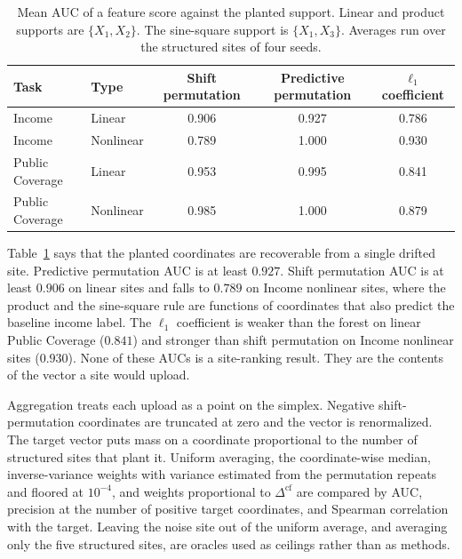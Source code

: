 \begin{table}[t]
\centering
\caption{Mean AUC of a feature score against the planted support.
Linear and product supports are $\{X_1,X_2\}$.
The sine-square support is $\{X_1,X_3\}$.
Averages run over the structured sites of four seeds.}
\label{tab:feature}
\begin{tabular}{llccc}
\toprule
Task & Type & Shift permutation & Predictive permutation & $\ell_1$ coefficient \\
\midrule
Income & Linear & 0.906 & 0.927 & 0.786 \\
Income & Nonlinear & 0.789 & 1.000 & 0.930 \\
Public Coverage & Linear & 0.953 & 0.995 & 0.841 \\
Public Coverage & Nonlinear & 0.985 & 1.000 & 0.879 \\
\bottomrule
\end{tabular}
\end{table}

Table~\ref{tab:feature} says that the planted coordinates are recoverable
from a single drifted site.
Predictive permutation AUC is at least $0.927$.
Shift permutation AUC is at least $0.906$ on linear sites and falls to
$0.789$ on Income nonlinear sites, where the product and the sine-square
rule are functions of coordinates that also predict the baseline income
label.
The $\ell_1$ coefficient is weaker than the forest on linear Public
Coverage ($0.841$) and stronger than shift permutation on Income nonlinear
sites ($0.930$).
None of these AUCs is a site-ranking result.
They are the contents of the vector a site would upload.

Aggregation treats each upload as a point on the simplex.
Negative shift-permutation coordinates are truncated at zero and the vector
is renormalized.
The target vector puts mass on a coordinate proportional to the number of
structured sites that plant it.
Uniform averaging, the coordinate-wise median, inverse-variance weights
with variance estimated from the permutation repeats and floored at
$10^{-4}$, and weights proportional to $\Delta^{\mathrm{cf}}$ are compared
by AUC, precision at the number of positive target coordinates, and
Spearman correlation with the target.
Leaving the noise site out of the uniform average, and averaging only the
five structured sites, are oracles used as ceilings rather than as methods.

